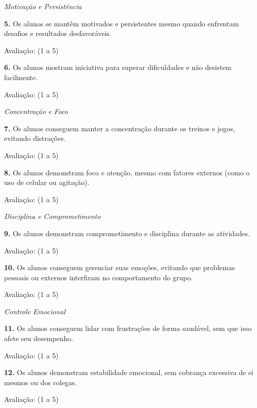 \textit{Motivação e Persistência}

\textbf{5.} Os alunos se mantêm motivados e persistentes mesmo quando enfrentam desafios e resultados desfavoráveis.

Avaliação: \underline{\hspace{2cm}} (1 a 5)

\textbf{6.} Os alunos mostram iniciativa para superar dificuldades e não desistem facilmente.

Avaliação: \underline{\hspace{2cm}} (1 a 5)

\textit{Concentração e Foco}

\textbf{7.} Os alunos conseguem manter a concentração durante os treinos e jogos, evitando distrações.

Avaliação: \underline{\hspace{2cm}} (1 a 5)

\textbf{8.} Os alunos demonstram foco e atenção, mesmo com fatores externos (como o uso de celular ou agitação).

Avaliação: \underline{\hspace{2cm}} (1 a 5)

\textit{Disciplina e Comprometimento}

\textbf{9.} Os alunos demonstram comprometimento e disciplina durante as atividades.

Avaliação: \underline{\hspace{2cm}} (1 a 5)

\textbf{10.} Os alunos conseguem gerenciar suas emoções, evitando que problemas pessoais ou externos interfiram no comportamento do grupo.

Avaliação: \underline{\hspace{2cm}} (1 a 5)

\textit{Controle Emocional}

\textbf{11.} Os alunos conseguem lidar com frustrações de forma saudável, sem que isso afete seu desempenho.

Avaliação: \underline{\hspace{2cm}} (1 a 5)

\textbf{12.} Os alunos demonstram estabilidade emocional, sem cobrança excessiva de si mesmos ou dos colegas.

Avaliação: \underline{\hspace{2cm}} (1 a 5)
